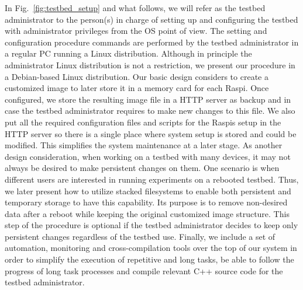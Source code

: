 In Fig.~\ref{fig:testbed_setup} and what follows, we will refer as the
testbed administrator to the person(s) in charge of setting up and
configuring the testbed with administrator privileges from the \ac{OS}
point of view. The setting and configuration procedure commands are
performed by the testbed administrator in a regular \ac{PC} running a
Linux distribution. Although in principle the administrator
Linux distribution is not a restriction, we present our procedure in a
Debian-based Linux distribution. Our basic design considers to create
a customized image to later store it in a memory card for each \ac{Raspi}.
Once configured, we store the resulting image file in a \ac{HTTP} server
as backup and in case the testbed administrator requires to make new
changes to this file. We also put all the required configuration files
and scripts for the \ac{Raspi}s setup in the \ac{HTTP} server so there is
a single place where system setup is stored and could be modified.
This simplifies the system maintenance at a later stage.
As another design consideration, when working on a testbed
with many devices, it may not always be desired to make persistent changes
on them. One scenario is when different users are interested in
running experiments on a rebooted testbed. Thus, we later present how
to utilize stacked filesystems to enable both persistent and
temporary storage to have this capability. Its purpose is to
remove non-desired data after a reboot while keeping the original
customized image structure. This step of the procedure is optional if
the testbed administrator decides to keep only persistent changes regardless
of the testbed use. Finally, we include a set of automation, monitoring
and cross-compilation tools over the top of our system in order to simplify
the execution of repetitive and long tasks, be able to follow the progress
of long task processes and compile relevant C++ source code for the testbed
administrator.


